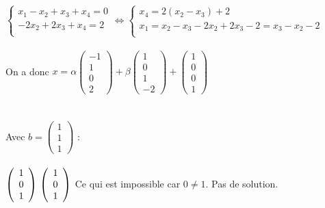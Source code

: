 \documentclass[11pt, fleqn]{report}
\begin{document}
\\
\\
$ \begin{cases}
	x_1-x_2+x_3+x_4=0\\
	-2x_2+2x_3+x_4=2\\
\end{cases} 
\Leftrightarrow
\begin{cases}
	x_4=2(x_2-x_3)+2\\
	x_1=x_2-x_3-2x_2+2x_3-2=x_3-x_2-2\\
\end{cases}$
\\
\\
On a donc $ x = \alpha \left(\begin{array}{l} -1\\1\\0\\2 \end{array}\right) + \beta \left(\begin{array}{l} 1\\0\\1\\-2 \end{array} \right) + \left(\begin{array}{c}1 \\0 \\0 \\1\end{array}\right) $
\\
\\
\\
Avec $ b = \left(\begin{array}{c}1 \\1 \\1\end{array}\right) $ :
\\
\\
$ \left(\begin{array}{c}1 \\0 \\1\end{array}\right)
\\
\\
\left(\begin{array}{c}1 \\0 \\1\end{array}\right) $ Ce qui est impossible car $ 0 \neq 1 $. Pas de solution.

	
\end{document}
